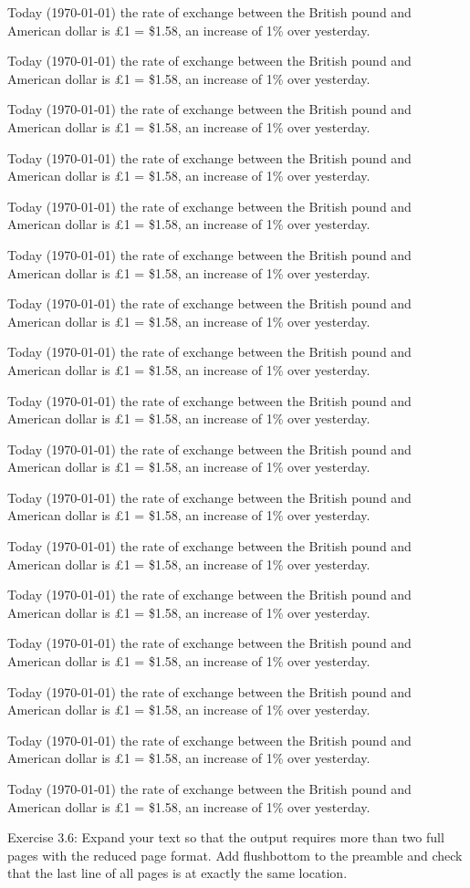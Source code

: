 \documentclass{article}
\begin{document}
\begin{multicols}{5}
Today (\today) the rate of exchange between the British
pound and American dollar is \pounds 1 = \$1.58, an
increase of 1\% over yesterday.

Today (\today) the rate of exchange between the British
pound and American dollar is \pounds 1 = \$1.58, an
increase of 1\% over yesterday.

Today (\today) the rate of exchange between the British
pound and American dollar is \pounds 1 = \$1.58, an
increase of 1\% over yesterday.

Today (\today) the rate of exchange between the British
pound and American dollar is \pounds 1 = \$1.58, an
increase of 1\% over yesterday.

Today (\today) the rate of exchange between the British
pound and American dollar is \pounds 1 = \$1.58, an
increase of 1\% over yesterday.

Today (\today) the rate of exchange between the British
pound and American dollar is \pounds 1 = \$1.58, an
increase of 1\% over yesterday.

Today (\today) the rate of exchange between the British
pound and American dollar is \pounds 1 = \$1.58, an
increase of 1\% over yesterday.

Today (\today) the rate of exchange between the British
pound and American dollar is \pounds 1 = \$1.58, an
increase of 1\% over yesterday.

Today (\today) the rate of exchange between the British
pound and American dollar is \pounds 1 = \$1.58, an
increase of 1\% over yesterday.

Today (\today) the rate of exchange between the British
pound and American dollar is \pounds 1 = \$1.58, an
increase of 1\% over yesterday.

Today (\today) the rate of exchange between the British
pound and American dollar is \pounds 1 = \$1.58, an
increase of 1\% over yesterday.

Today (\today) the rate of exchange between the British
pound and American dollar is \pounds 1 = \$1.58, an
increase of 1\% over yesterday.

Today (\today) the rate of exchange between the British
pound and American dollar is \pounds 1 = \$1.58, an
increase of 1\% over yesterday.

Today (\today) the rate of exchange between the British
pound and American dollar is \pounds 1 = \$1.58, an
increase of 1\% over yesterday.

Today (\today) the rate of exchange between the British
pound and American dollar is \pounds 1 = \$1.58, an
increase of 1\% over yesterday.

Today (\today) the rate of exchange between the British
pound and American dollar is \pounds 1 = \$1.58, an
increase of 1\% over yesterday.

Today (\today) the rate of exchange between the British
pound and American dollar is \pounds 1 = \$1.58, an
increase of 1\% over yesterday.

Exercise 3.6: Expand your text so that the output requires more than two
full pages with the reduced page format. Add flushbottom to the preamble
and check that the last line of all pages is at exactly the same
location.
\end{multicols}
\end{document}
